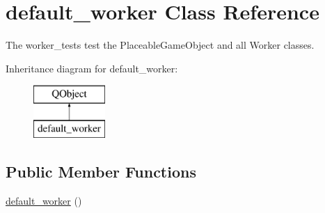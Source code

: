 \hypertarget{classdefault__worker}{\section{default\-\_\-worker Class Reference}
\label{classdefault__worker}
}


The worker\-\_\-tests test the Placeable\-Game\-Object and all Worker classes.  


Inheritance diagram for default\-\_\-worker\-:\begin{figure}[H]
\begin{center}
\leavevmode
\includegraphics[height=2.000000cm]{classdefault__worker}
\end{center}
\end{figure}
\subsection*{Public Member Functions}
\begin{DoxyCompactItemize}
\item 
\hyperlink{classdefault__worker_a7c7de24d48b778cbbfaab029152523e4}{default\-\_\-worker} ()
\end{DoxyCompactItemize}
